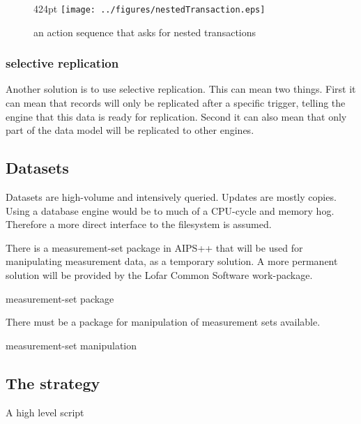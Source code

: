 \documentclass[]{lofar}
\begin{document}
        \begin{figure}{424pt}
          \texttt{[image: ../figures/nestedTransaction.eps]}
          \hypertarget{fig:nestedTransaction}{}
          \caption{an action sequence that asks for nested transactions\label{fig:nestedTransactions}}
        \end{figure}

      \subsubsection{selective replication}
      \label{subsubsec:selective-replication}\hypertarget{subsubsec:selective-replication}{}%

        Another solution is to use selective replication. This can
        mean two things. First it can mean that records will only be
        replicated after a specific trigger, telling the engine that
        this data is ready for replication. Second it can also mean
        that only part of the data model will be replicated to other
        engines.

    \subsection{Datasets}
    \label{subsec:Datasets}\hypertarget{subsec:Datasets}{}

      Datasets are high-volume and intensively queried. Updates are
      mostly copies. Using a database engine would be to much of a
      CPU-cycle and memory hog. Therefore a more direct interface to
      the filesystem is assumed.

      \begin{assumption}
        There is a measurement-set package in AIPS++ that will be used
        for manipulating measurement data, as a temporary solution. A
        more permanent solution will be provided by the Lofar Common
        Software work-package.
        \caption{measurement-set package\label{ass:aips++}}
      \end{assumption}

      \begin{prerequisite}
        There must be a package for manipulation of measurement sets available.
        \caption{measurement-set manipulation\label{pre:aips++}}
      \end{prerequisite}

    \subsection{The strategy}{A high level script}
    \label{subsec:strategy}\hypertarget{subsec:strategy}{}
\end{document}
